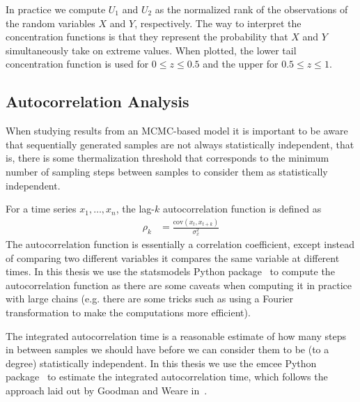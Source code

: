 In practice we compute \( U_1 \) and \( U_2 \) as the normalized rank of the observations of the random variables \( X \) and \( Y \), respectively.
The way to interpret the concentration functions is that they represent the probability that \( X \) and \( Y \) simultaneously take on extreme values.
When plotted, the lower tail concentration function is used for \( 0 \le z \le 0.5 \) and the upper for \( 0.5 \le z \le 1 \).

\subsection{Autocorrelation Analysis}\label{app:autocorrelation_analysis}
When studying results from an MCMC-based model it is important to be aware that sequentially generated samples are not always statistically independent, that is, there is some thermalization threshold that corresponds to the minimum number of sampling steps between samples to consider them as statistically independent.

For a time series \( x_1, \dots, x_n \), the lag-\( k \) autocorrelation function is defined as~\cite{time_series_analysis}
\begin{align}
    \rho_k
        &= \frac{\text{cov}(x_t, x_{t+k})}{\sigma_{x}^2}
\end{align}
The autocorrelation function is essentially a correlation coefficient, except instead of comparing two different variables it compares the same variable at different times.
In this thesis we use the statsmodels Python package~\cite{python_statsmodels} to compute the autocorrelation function as there are some caveats when computing it in practice with large chains (e.g. there are some tricks such as using a Fourier transformation to make the computations more efficient).

The integrated autocorrelation time is a reasonable estimate of how many steps in between samples we should have before we can consider them to be (to a degree) statistically independent.
In this thesis we use the emcee Python package~\cite{python_emcee} to estimate the integrated autocorrelation time, which follows the approach laid out by Goodman and Weare in~\cite{goodman_weare_2010}.

